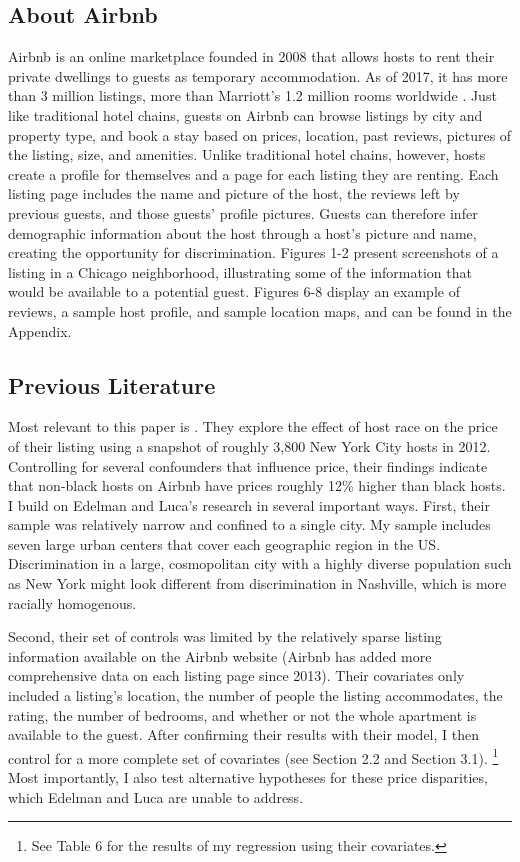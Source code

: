 \subsection{About Airbnb} 
Airbnb is an online marketplace founded in 2008 that allows hosts to rent their private dwellings to guests as temporary accommodation. As of 2017, it has more than 3 million listings, more than Marriott's 1.2 million rooms worldwide \citep{aboutus}. Just like traditional hotel chains, guests on Airbnb can browse listings by city and property type, and book a stay based on prices, location, past reviews, pictures of the listing, size, and amenities. Unlike traditional hotel chains, however, hosts create a profile for themselves and a page for each listing they are renting. Each listing page includes the name and picture of the host, the reviews left by previous guests, and those guests' profile pictures. Guests can therefore infer demographic information about the host through a host's picture and name, creating the opportunity for discrimination. Figures 1-2 present screenshots of a listing in a Chicago neighborhood, illustrating some of the information that would be available to a potential guest. Figures 6-8 display an example of reviews, a sample host profile, and sample location maps, and can be found in the Appendix.


\subsection{Previous Literature} 
Most relevant to this paper is \cite{edelman}. They explore the effect of host race on the price of their listing using a snapshot of roughly 3,800 New York City hosts in 2012. Controlling for several confounders that influence price, their findings indicate that non-black hosts on Airbnb have prices roughly 12\% higher than black hosts. I build on Edelman and Luca's research in several important ways. First, their sample was relatively narrow and confined to a single city. My sample includes seven large urban centers that cover each geographic region in the US. Discrimination in a large, cosmopolitan city with a highly diverse population such as New York might look different from discrimination in Nashville, which is more racially homogenous.

Second, their set of controls was limited by the relatively sparse listing information available on the Airbnb website (Airbnb has added more comprehensive data on each listing page since 2013). Their covariates only included a listing's location, the number of people the listing accommodates, the rating, the number of bedrooms, and whether or not the whole apartment is available to the guest. After confirming their results with their model, I then control for a more complete set of covariates (see Section 2.2 and Section 3.1).%
	\footnote{See Table 6 for the results of my regression using their covariates.} 
Most importantly, I also test alternative hypotheses for these price disparities, which Edelman and Luca are unable to address. 

